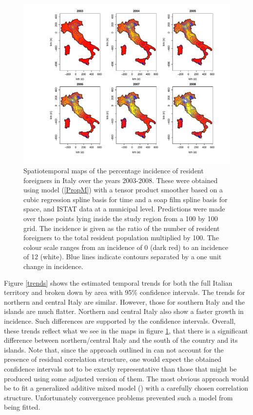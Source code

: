 \begin{figure}[t]
	\centering
		\includegraphics[width=\textwidth]{it/maps-Soap.pdf}
	\caption{Spatiotemporal maps of the percentage incidence of resident foreigners in Italy over the years 2003-2008. These were obtained using model (\ref{PropM}) with a tensor product smoother based on a cubic regression spline basis for time and a soap film spline basis for space, and ISTAT data at a municipal level. Predictions were made over those points lying inside the study region from a 100 by 100 grid. The incidence is given as the ratio of the number of resident foreigners to the total resident population multiplied by 100. The colour scale ranges from an incidence of 0 (dark red) to an incidence of 12 (white). Blue lines indicate contours separated by a one unit change in incidence.}
	\label{it-fig1}
\end{figure}

Figure \ref{trends} shows the estimated temporal trends for both the full Italian territory and broken down by area with 95\% confidence intervals. The trends for northern and central Italy are similar. However, those for southern Italy and the islands are much flatter. Northern and central Italy also show a faster growth in incidence. Such differences are supported by the confidence intervals. Overall, these trends reflect what we see in the maps in figure \ref{it-fig1}, that there is a significant difference between northern/central Italy and the south of the country and its islands. Note that, since the approach outlined in  can not account for the presence of residual correlation structure, one would expect the obtained confidence intervals not to be exactly representative than those that might be produced using some adjusted version of them. The most obvious approach would be to fit a generalized additive mixed model (\cite[chapter 6]{simonbook}) with a carefully chosen correlation structure. Unfortunately convergence problems prevented such a model from being fitted.

